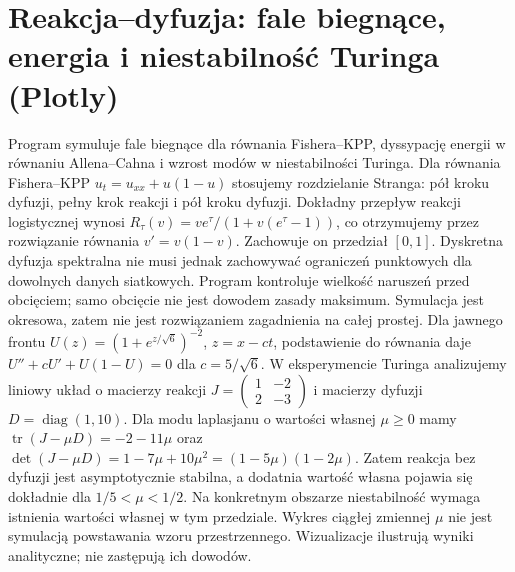 \section{Reakcja--dyfuzja: fale biegnące, energia i niestabilność Turinga (Plotly)}
\label{sec:pde27-code}
Program symuluje fale biegnące dla równania Fishera--KPP,
dyssypację energii w równaniu Allena--Cahna i wzrost modów
w niestabilności Turinga. Dla równania Fishera--KPP
$u_t=u_{xx}+u(1-u)$ stosujemy rozdzielanie Stranga:
pół kroku dyfuzji, pełny krok reakcji i pół kroku dyfuzji.
Dokładny przepływ reakcji logistycznej wynosi
$R_\tau(v)=ve^\tau/(1+v(e^\tau-1))$, co otrzymujemy
przez rozwiązanie równania $v'=v(1-v)$.
Zachowuje on przedział $[0,1]$.
Dyskretna dyfuzja spektralna nie musi jednak zachowywać
ograniczeń punktowych dla dowolnych danych siatkowych.
Program kontroluje wielkość naruszeń przed obcięciem;
samo obcięcie nie jest dowodem zasady maksimum.
Symulacja jest okresowa, zatem nie jest rozwiązaniem
zagadnienia na całej prostej.
Dla jawnego frontu $U(z)=(1+e^{z/\sqrt6})^{-2}$,
$z=x-ct$, podstawienie do równania daje
$U''+cU'+U(1-U)=0$ dla $c=5/\sqrt6$.
W eksperymencie Turinga analizujemy liniowy układ
o macierzy reakcji $J=\left(\begin{smallmatrix}1&-2\\2&-3\end{smallmatrix}\right)$
i macierzy dyfuzji $D=\operatorname{diag}(1,10)$.
Dla modu laplasjanu o wartości własnej $\mu\ge0$
mamy $\operatorname{tr}(J-\mu D)=-2-11\mu$ oraz
$\det(J-\mu D)=1-7\mu+10\mu^2=(1-5\mu)(1-2\mu)$.
Zatem reakcja bez dyfuzji jest asymptotycznie stabilna,
a dodatnia wartość własna pojawia się dokładnie dla
$1/5<\mu<1/2$. Na konkretnym obszarze niestabilność
wymaga istnienia wartości własnej w tym przedziale.
Wykres ciągłej zmiennej $\mu$ nie jest symulacją
powstawania wzoru przestrzennego.
Wizualizacje ilustrują wyniki analityczne;
nie zastępują ich dowodów.
